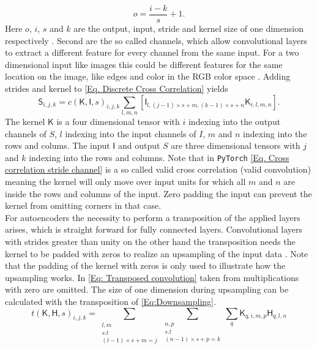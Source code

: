 \begin{equation}\label{Eq:Downsampling}
	o = \frac{i -k}{s} + 1.
\end{equation} 
Here \(o\), \(i\), \(s\) and \(k\) are the output, input, stride and kernel size of one dimension respectively \cite{dumoulin2018guide}. Second are the so called channels, which allow convolutional layers to extract a different feature for every channel from the same input. For a two dimensional input like images this could be different features for the same location on the image, like edges and color in the RGB color space \cite{Goodfellow}. Adding strides and kernel to \cref{Eq. Discrete Cross Correlation} yields
\begin{equation}
	\mathsf{S}_{i,j,k} = c(\mathsf{K},\mathsf{I},s)_{i,j,k}\sum_{l,m,n}\left[\mathsf{I}_{l,(j-1)\times s+m,(k -1)\times s+n}\mathsf{K}_{i,l,m,n}\right]. \label{Eq. Cross correlation stride channel}
\end{equation}
The kernel \(\mathsf{K}\) is a four dimensional tensor with \(i\) indexing into the output channels of \(S\), \(l\) indexing into the input channels of \(I\), \(m\) and \(n\) indexing into the rows and colums. The input \(\mathsf{I}\) and output \(S\) are three dimensional tensors with \(j\) and \(k\) indexing into the rows and columns. Note that in \texttt{PyTorch} \cref{Eq. Cross correlation stride channel} is a so called valid cross correlation (valid convolution) \cite{bibid} meaning the kernel will only move over input units for which  all \(m\) and \(n\) are inside the rows and columns of the input. Zero padding the input can prevent the kernel from omitting corners in that case.
\\
For autoencoders the necessity to perform a transposition of the applied layers arises, which is straight forward for fully connected layers. Convolutional layers with strides greater than unity on the other hand  the transposition needs the kernel to be padded with zeros to realize an upsampling of the input data \cite{dumoulin2018guide}. Note that the padding of the kernel with zeros is only used to illustrate how the upsampling works. In \cref{Eq: Transposed convolution} taken from \cite{Goodfellow} multiplications with zero are omitted. The size of one dimension during upsampling can be calculated with the transposition of \cref{Eq:Downsampling}.
\begin{equation}\label{Eq: Transposed convolution}
	t(\mathsf{K},\mathsf{H},s)_{i,j,k} = \sum_{\substack{l,m\\s.t\\(l-1)\times s+m=j}}
												  \sum_{\substack{n,p\\s.t\\(n-1)\times s+p=k}}
												  \sum_q \mathsf{K}_{q,i,m,p}\mathsf{H}_{q,l,n} 
\end{equation}
